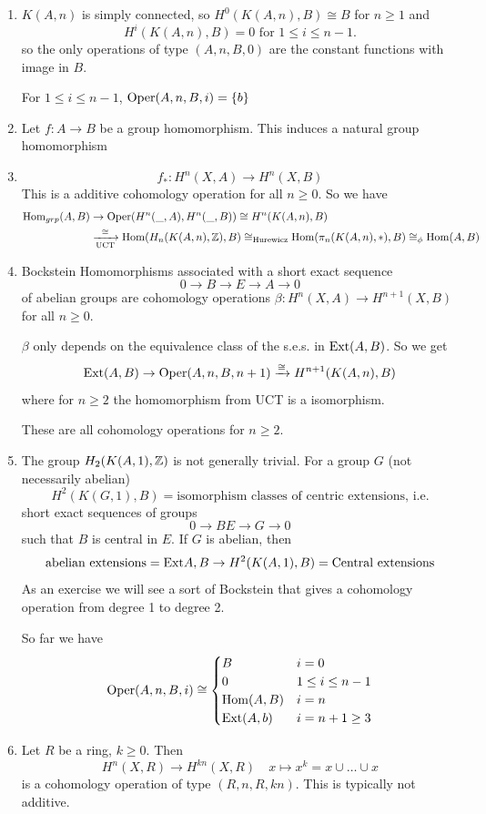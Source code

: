 \documentclass[language=english]{TemplateLecture}
\begin{document}
\begin{example}
    \begin{enumerate}
        \item \(K(A,n)\) is simply connected, so \(H^0(K(A,n), B)\cong B\) for \(n\geq 1\) and
        \[H^i(K(A,n), B) = 0 \text{ for } 1\leq i \leq n-1.\]
        so the only operations of type \((A,n, B,0)\) are the constant functions with image in \(B\).

        For \(1\leq i\leq n-1\), \(\mathrm{Oper}(A,n,B,i)= \{b\}\)
        \item Let \(f\colon A\to B\) be a group homomorphism. This induces a natural group homomorphism
        \item \[f_*\colon H^n(X,A)\to H^n(X,B)\]
        This is a additive cohomology operation for all \(n\geq 0\). So we have
        \[\begin{split}
            \operatorname{Hom}_{grp}(A,B)&\to \mathrm{Oper}(H^n(\_, A), H^n(\_, B))\cong H^n(K(A,n),B) \\
            &\xrightarrow[\text{UCT}]{\cong} \operatorname{Hom}(H_n(K(A,n),\mathbb{Z}), B)\cong_{\text{Hurewicz}} \operatorname{Hom}(\pi_n(K(A,n), *), B) \cong_\phi \operatorname{Hom}(A,B)
        \end{split}\]
        \item Bockstein Homomorphisms associated with a short exact sequence
        \[0\to B \to E\to A\to 0\]
        of abelian groups are cohomology operations \(\beta\colon H^n(X,A)\to H^{n+1}(X,B)\) for all \(n\geq 0\).

        \(\beta\) only depends on the equivalence class of the s.e.s. in \(\mathrm{Ext}(A,B)\). So we get
        \[\mathrm{Ext}(A,B)\to \mathrm{Oper}(A,n, B, n+1) \xrightarrow{\cong} H^{n+1}(K(A,n),B)\]
        where for \(n\geq 2\) the homomorphism from UCT is a isomorphism.

        These are all cohomology operations for \(n\geq 2\).
        \item The group \(H_2(K(A,1), \mathbb{Z})\) is not generally trivial. For a group \(G\) (not necessarily abelian)
        \[H^2(K(G,1), B) = \text{isomorphism classes of centric extensions, i.e.}\]
        short exact sequences of groups
        \[0\to B E\to G\to 0\]
        such that \(B\) is central in \(E\). If \(G\) is abelian, then
        \[\text{abelian extensions} = \mathrm{Ext}{A,B} \to H^2(K(A,1), B) = \text{Central extensions}\]
        As an exercise we will see a sort of Bockstein that gives a cohomology operation from degree 1 to degree 2.

        So far we have
        \[\mathrm{Oper}(A,n,B,i)\cong \begin{cases}
            B & i = 0 \\
            0 & 1\leq i\leq n-1\\
            \operatorname{Hom}(A,B) & i = n \\
            \mathrm{Ext}(A,b) & i = n+1 \geq 3 \\
        \end{cases}\]
        \item Let \(R\) be a ring, \(k\geq 0\). Then
        \[H^n(X,R)\to H^{kn}(X,R)\quad x\mapsto x^k = x\cup \dots \cup x\]
        is a cohomology operation of type \((R,n,R,kn)\). This is typically not additive.


\end{enumerate}
\end{example}
\end{document}
